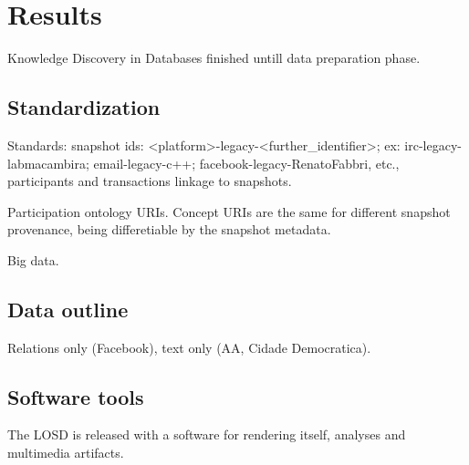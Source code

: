 \documentclass[review]{elsarticle}
\begin{document}
\section{Results}
\label{outline}
Knowledge Discovery in Databases finished untill data preparation phase.
\subsection{Standardization}
Standards: snapshot ids: <platform>-legacy-<further\_identifier>;
ex: irc-legacy-labmacambira; email-legacy-c++;
facebook-legacy-RenatoFabbri, etc., participants and transactions linkage to
snapshots.

Participation ontology URIs. Concept URIs are the same for different
snapshot provenance, being differetiable by the snapshot metadata.

Big data.
\subsection{Data outline}
Relations only (Facebook), text only (AA, Cidade Democratica).



\subsection{Software tools}
The LOSD is released with a software for rendering itself, analyses and
multimedia artifacts.
\end{document}

